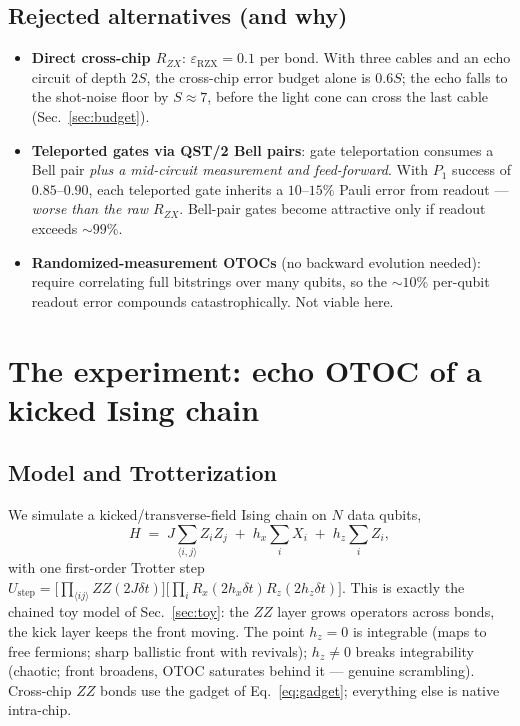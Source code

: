 \documentclass[11pt]{article}
\newcommand{\erzx}{\varepsilon_{\mathrm{RZX}}}
\begin{document}
\subsection{Rejected alternatives (and why)}

\begin{itemize}
  \item \textbf{Direct cross-chip $R_{ZX}$}: $\erzx=0.1$ per bond. With three
  cables and an echo circuit of depth $2S$, the cross-chip error budget alone
  is $0.6S$; the echo falls to the shot-noise floor by $S\approx7$, before
  the light cone can cross the last cable (Sec.~\ref{sec:budget}).
  \item \textbf{Teleported gates via QST/2 Bell pairs}: gate teleportation
  consumes a Bell pair \emph{plus a mid-circuit measurement and feed-forward}.
  With $P_1$ success of $0.85$--$0.90$, each teleported gate inherits a
  $10$--$15\%$ Pauli error from readout --- \emph{worse than the raw
  $R_{ZX}$}. Bell-pair gates become attractive only if readout exceeds
  ${\sim}99\%$.
  \item \textbf{Randomized-measurement OTOCs} (no backward evolution needed):
  require correlating full bitstrings over many qubits, so the ${\sim}10\%$
  per-qubit readout error compounds catastrophically. Not viable here.
\end{itemize}

\section{The experiment: echo OTOC of a kicked Ising chain}

\subsection{Model and Trotterization}

We simulate a kicked/transverse-field Ising chain on $N$ data qubits,
\begin{equation}
  H \;=\; J\sum_{\langle i,j\rangle} Z_i Z_j \;+\; h_x \sum_i X_i \;+\; h_z \sum_i Z_i ,
\end{equation}
with one first-order Trotter step
$U_{\mathrm{step}} = \big[\prod_{\langle ij\rangle} ZZ(2J\delta t)\big]
\big[\prod_i R_x(2h_x\delta t) R_z(2h_z\delta t)\big]$.
This is exactly the chained toy model of Sec.~\ref{sec:toy}: the $ZZ$ layer
grows operators across bonds, the kick layer keeps the front moving. The
point $h_z=0$ is integrable (maps to free fermions; sharp ballistic front
with revivals); $h_z\neq0$ breaks integrability (chaotic; front broadens,
OTOC saturates behind it --- genuine scrambling). Cross-chip $ZZ$ bonds use
the gadget of Eq.~\eqref{eq:gadget}; everything else is native intra-chip.
\end{document}
